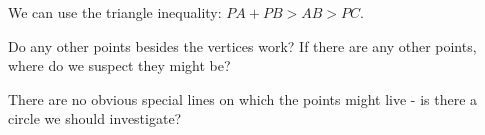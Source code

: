 



We can use the triangle inequality: $PA + PB > AB > PC$.

Do any other points besides the vertices work? If there are any other points, where do we suspect they might be?







There are no obvious special lines on which the points might live - is there a circle we should investigate?








